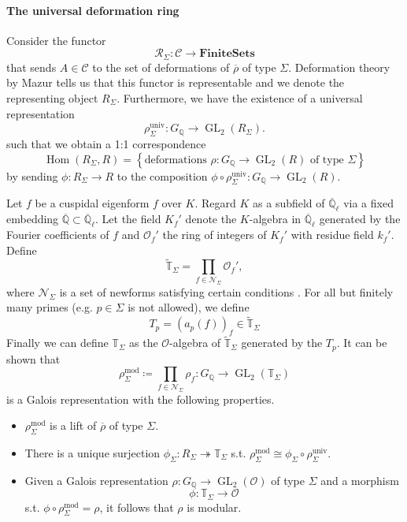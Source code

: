 \documentclass{article}
\theoremstyle{plain}%
\theoremstyle{definition}
\theoremstyle{remark}
\renewcommand{\hom}{\operatorname{Hom}}
\newcommand{\GL}{\operatorname{GL}}
\begin{document}
\paragraph{The universal deformation ring}
Consider the functor
\[
    \mathcal{R}_\Sigma \colon \mathcal{C} \to \mathrm{\mathbf{FiniteSets}}  
\]
that sends \(A \in \mathcal{C}\) to the set of deformations of \(\overline{\rho}\) of type \(\Sigma\).
Deformation theory by Mazur tells us that this functor is representable and we 
denote the representing object \(R_\Sigma\).
Furthermore, we have the existence of a universal representation
\[ 
    \rho_\Sigma^\mathrm{univ}\colon G_\mathbb{Q} \to \GL_2(R_\Sigma).
\]
such that we obtain a 1:1 correspondence
\[
    \hom(R_\Sigma, R) = \left\{\text{deformations } \rho \colon G_\mathbb{Q} \to \GL_2(R) \text{ of type }\Sigma\right\}  
\]
by sending \(\phi \colon R_\Sigma \to R\) to the composition
\(\phi \circ \rho_\Sigma^\mathrm{univ}\colon G_\mathbb{Q} \to \GL_2(R)\).

Let \(f\) be a cuspidal eigenform \(f\) over \(K\). Regard \(K\) as a subfield of \(\overline{\mathbb{Q}}_\ell\) 
via a fixed embedding \(\overline{\mathbb{Q}} \subset \overline{\mathbb{Q}}_\ell\).
Let the field \(K_f'\) denote the \(K\)-algebra in \(\overline{\mathbb{Q}}_\ell\) generated by
the Fourier coefficients of \(f\) and \(\mathcal{O}_f'\) the ring of integers of \(K_f'\)
with residue field \(k_f'\).
Define
\[
    \tilde{\mathbb{T}}_\Sigma = \prod_{f \in \mathcal{N}_\Sigma} \mathcal{O}_f',
\]
where \(\mathcal{N}_\Sigma\) is a set of newforms satisfying certain conditions \cite[see][lemma 3.26]{Darmon1995}.
For all but finitely many primes (e.g. \(p \in \Sigma\) is not allowed), we define
\[
    T_p = (a_p(f))_{f} \in \tilde{\mathbb{T}}_\Sigma 
\]
Finally we can define \(\mathbb{T}_\Sigma\) as the \(\mathcal{O}\)-algebra of \(\tilde{\mathbb{T}}_\Sigma\)
generated by the \(T_p\).
It can be shown \cite[cf.][lemma 3.27]{Darmon1995} that
\[
    \rho_\Sigma^\mathrm{mod} \coloneqq \prod_{f\in \mathcal{N}_\Sigma} \rho_f \colon G_\mathbb{Q} \to \GL_2(\mathbb{T}_\Sigma)
\]
is a Galois representation with the following properties.
\begin{itemize}
    \item \(\rho_\Sigma^\mathrm{mod}\) is a lift of \(\overline{\rho}\) of type \(\Sigma\).
    \item There is a unique surjection \(\phi_\Sigma\colon R_\Sigma \twoheadrightarrow \mathbb{T}_\Sigma\) 
    s.t. \(\rho_\Sigma^\mathrm{mod} \cong \phi_\Sigma \circ \rho_\Sigma^\mathrm{univ}\).
    \item Given a Galois representation \(\rho\colon G_\mathbb{Q} \to \GL_2(\mathcal{O})\) of type \(\Sigma\) and a morphism 
    \[
        \phi \colon \mathbb{T}_\Sigma \to \mathcal{O}
    \]
    s.t. \(\phi \circ \rho^{\mathrm{mod}}_{\Sigma} = \rho\), it follows that \(\rho\) is modular.
\end{itemize}
\end{document}
